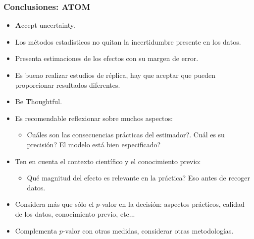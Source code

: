 \documentclass[9pt]{beamer}
\begin{document}
\begin{frame}
  \frametitle{Conclusiones: ATOM}
  \begin{block}{}
  \begin{itemize}
  \item \textbf{\Huge A}ccept uncertainty.
  \end{itemize}
\end{block}

\begin{itemize}
\item<3-> Los métodos estadísticos no quitan la incertidumbre presente en
  los datos.
\item<4-> Presenta estimaciones de los efectos con su margen de error.
\item<5-> Es bueno realizar estudios de réplica, hay que aceptar que
  pueden proporcionar resultados diferentes.
\end{itemize}
\begin{block}{}
  \begin{itemize}
  \item Be \textbf{\Huge T}houghtful.
  \end{itemize}
\end{block}


\begin{itemize}
\item<7-> Es recomendable reflexionar sobre muchos aspectos:
  \begin{itemize}
  \item Cuáles son las consecuencias prácticas del estimador?.  Cuál es
    su precisión? El modelo está bien especificado?
  \end{itemize}
 
\item<8-> Ten en cuenta el contexto científico y el conocimiento
  previo:
  \begin{itemize}
  \item Qué magnitud del efecto es relevante en la práctica? Eso antes
    de recoger datos.
  \end{itemize}
\item<9-> Considera más que sólo el $p$-valor en la decisión:
  aspectos prácticos, calidad de los datos, conocimiento previo,
  etc...
\item<10-> Complementa $p$-valor con otras medidas, considerar otras metodologías. 
\end{itemize}

\end{frame}
\end{document}

